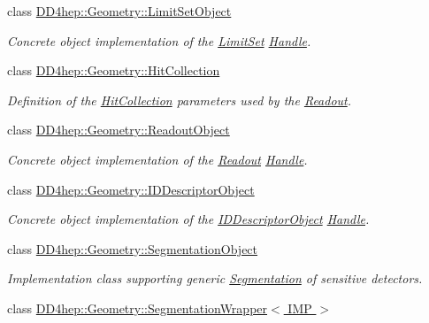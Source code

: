 \begin{DoxyCompactItemize}
class \hyperlink{class_d_d4hep_1_1_geometry_1_1_limit_set_object}{D\+D4hep\+::\+Geometry\+::\+Limit\+Set\+Object}
\begin{DoxyCompactList}\small\item\em Concrete object implementation of the \hyperlink{class_d_d4hep_1_1_geometry_1_1_limit_set}{Limit\+Set} \hyperlink{class_d_d4hep_1_1_handle}{Handle}. \end{DoxyCompactList}\item 
class \hyperlink{class_d_d4hep_1_1_geometry_1_1_hit_collection}{D\+D4hep\+::\+Geometry\+::\+Hit\+Collection}
\begin{DoxyCompactList}\small\item\em Definition of the \hyperlink{class_d_d4hep_1_1_geometry_1_1_hit_collection}{Hit\+Collection} parameters used by the \hyperlink{class_d_d4hep_1_1_geometry_1_1_readout}{Readout}. \end{DoxyCompactList}\item 
class \hyperlink{class_d_d4hep_1_1_geometry_1_1_readout_object}{D\+D4hep\+::\+Geometry\+::\+Readout\+Object}
\begin{DoxyCompactList}\small\item\em Concrete object implementation of the \hyperlink{class_d_d4hep_1_1_geometry_1_1_readout}{Readout} \hyperlink{class_d_d4hep_1_1_handle}{Handle}. \end{DoxyCompactList}\item 
class \hyperlink{class_d_d4hep_1_1_geometry_1_1_i_d_descriptor_object}{D\+D4hep\+::\+Geometry\+::\+I\+D\+Descriptor\+Object}
\begin{DoxyCompactList}\small\item\em Concrete object implementation of the \hyperlink{class_d_d4hep_1_1_geometry_1_1_i_d_descriptor_object}{I\+D\+Descriptor\+Object} \hyperlink{class_d_d4hep_1_1_handle}{Handle}. \end{DoxyCompactList}\item 
class \hyperlink{class_d_d4hep_1_1_geometry_1_1_segmentation_object}{D\+D4hep\+::\+Geometry\+::\+Segmentation\+Object}
\begin{DoxyCompactList}\small\item\em Implementation class supporting generic \hyperlink{class_d_d4hep_1_1_geometry_1_1_segmentation}{Segmentation} of sensitive detectors. \end{DoxyCompactList}\item 
class \hyperlink{class_d_d4hep_1_1_geometry_1_1_segmentation_wrapper}{D\+D4hep\+::\+Geometry\+::\+Segmentation\+Wrapper$<$ I\+M\+P $>$}

\end{DoxyCompactItemize}
